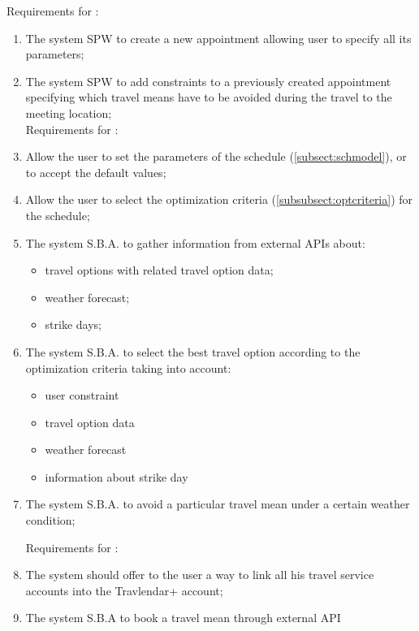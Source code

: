 Requirements for :
\begin{enumerate}
\renewcommand\labelenumi{\textbf{R\theenumi}}
\item The system SPW to create a new appointment allowing user to specify all its parameters; \label{req:R1}
\item The system SPW to add constraints to a previously created appointment specifying which travel means have to be avoided during the travel to the meeting location; \label{req:R2}
\\

Requirements for :

\item Allow the user to set the parameters of the schedule (\ref{subsect:schmodel}), or to accept the default values;
 
\item Allow the user to select the optimization criteria (\ref{subsubsect:optcriteria}) for the schedule;

\item The system S.B.A. to gather information from external APIs about: 
\begin{itemize}
\item travel options with related travel option data;
\item weather forecast;
\item strike days;
\end{itemize}

\item The system S.B.A. to select the best travel option according to the optimization criteria taking into account:
\begin{itemize}
\item user constraint
\item travel option data 
\item weather forecast
\item information about strike day
\end{itemize}


\item The system S.B.A. to avoid a particular travel mean under a certain weather condition;

Requirements for : 
\item The system should offer to the user a way to link all his travel service accounts into the Travlendar+ account;

\item The system S.B.A to book a travel mean through external API

\end{enumerate}


